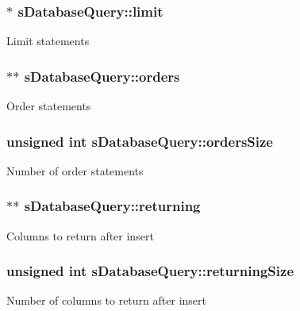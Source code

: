 \subsubsection[{\texorpdfstring{limit}{limit}}]{$\ast$ s\+Database\+Query\+::limit}\hypertarget{structsDatabaseQuery_aeca8178bae8fc02faae2bf64d6e7455a}{}\label{structsDatabaseQuery_aeca8178bae8fc02faae2bf64d6e7455a}
Limit statements 
\subsubsection[{\texorpdfstring{orders}{orders}}]{$\ast$$\ast$ s\+Database\+Query\+::orders}\hypertarget{structsDatabaseQuery_a4f2d3a55d0e7fcd151f7650c08ff7975}{}\label{structsDatabaseQuery_a4f2d3a55d0e7fcd151f7650c08ff7975}
Order statements 
\subsubsection[{\texorpdfstring{orders\+Size}{ordersSize}}]{\setlength{\rightskip}{0pt plus 5cm}unsigned int s\+Database\+Query\+::orders\+Size}\hypertarget{structsDatabaseQuery_aecb5648962f556532a3a2c91b4970397}{}\label{structsDatabaseQuery_aecb5648962f556532a3a2c91b4970397}
Number of order statements 
\subsubsection[{\texorpdfstring{returning}{returning}}]{$\ast$$\ast$ s\+Database\+Query\+::returning}\hypertarget{structsDatabaseQuery_ad88d21177dbe929109914b4b75665454}{}\label{structsDatabaseQuery_ad88d21177dbe929109914b4b75665454}
Columns to return after insert 
\subsubsection[{\texorpdfstring{returning\+Size}{returningSize}}]{\setlength{\rightskip}{0pt plus 5cm}unsigned int s\+Database\+Query\+::returning\+Size}\hypertarget{structsDatabaseQuery_a08dafb08cb00fac230eaceb0dfd20c9f}{}\label{structsDatabaseQuery_a08dafb08cb00fac230eaceb0dfd20c9f}
Number of columns to return after insert 
